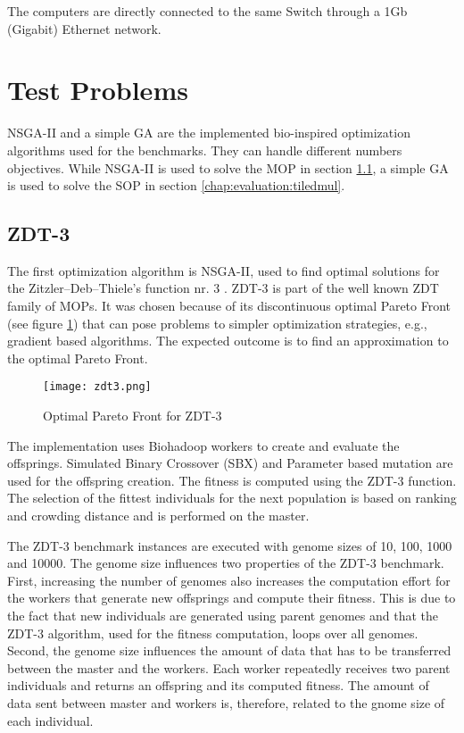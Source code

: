 The computers are directly connected to the same Switch through a 1Gb (Gigabit) Ethernet network.

\section{Test Problems}
\label{chap:evaluation:testproblems}
NSGA-II and a simple GA are the implemented bio-inspired optimization algorithms used for the benchmarks. They can handle different numbers objectives. While NSGA-II is used to solve the MOP in section \ref{chap:evaluation:zdt3}, a simple GA is used to solve the SOP in section \ref{chap:evaluation:tiledmul}.

\subsection{ZDT-3}
\label{chap:evaluation:zdt3}
The first optimization algorithm is NSGA-II, used to find optimal solutions for the Zitzler–Deb–Thiele's function nr. 3 \cite{zitzler2000comparison}. ZDT-3 is part of the well known ZDT family of MOPs. It was chosen because of its discontinuous optimal Pareto Front (see figure \ref{fig:zdt3}) that can pose problems to simpler optimization strategies, e.g., gradient based algorithms. The expected outcome is to find an approximation to the optimal Pareto Front.

\begin{figure}
  \centering
  \texttt{[image: zdt3.png]}
  \caption[Optimal Pareto Front for ZDT-3]{Optimal Pareto Front for ZDT-3}
  \label{fig:zdt3}
\end{figure}

The implementation uses Biohadoop workers to create and evaluate the offsprings. Simulated Binary Crossover (SBX) and Parameter based mutation \cite{deb2000efficient} are used for the offspring creation. The fitness is computed using the ZDT-3 function. The selection of the fittest individuals for the next population is based on ranking and crowding distance and is performed on the master.

The ZDT-3 benchmark instances are executed with genome sizes of 10, 100, 1000 and 10000. The genome size influences two properties of the ZDT-3 benchmark. First, increasing the number of genomes also increases the computation effort for the workers that generate new offsprings and compute their fitness. This is due to the fact that new individuals are generated using parent genomes and that the ZDT-3 algorithm, used for the fitness computation, loops over all genomes. Second, the genome size influences the amount of data that has to be transferred between the master and the workers. Each worker repeatedly receives two parent individuals and returns an offspring and its computed fitness. The amount of data sent between master and workers is, therefore, related to the gnome size of each individual.


